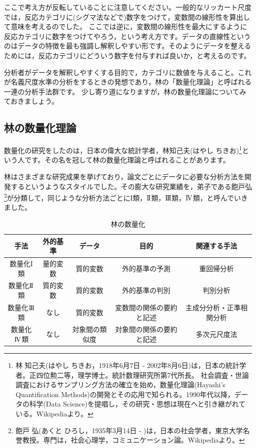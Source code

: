 \documentclass{ltjsbook}
\begin{document}
ここで考え方が反転していることに注意してください。一般的なリッカート尺度では，反応カテゴリに(シグマ法などで)数字をつけて，変数間の線形性を算出して意味を考えるのでした。
ここでは逆に，変数間の線形性を最大にするように反応カテゴリに数字をつけてやろう，という考え方です。データの直線性というのはデータの特徴を最も強調し解釈しやすい形です。そのようにデータを整えるためには，反応カテゴリにどういう数字を付与すれば良いか，と考えるのです。

分析者がデータを解釈しやすくする目的で，カテゴリに数値を与えること。これが名義尺度水準の分析をするときの発想であり，林の「数量化理論」と呼ばれる一連の分析手法群です。
少し寄り道になりますが，林の数量化理論についてみておきましょう。

\subsection{林の数量化理論}
数量化の研究をしたのは，日本の偉大な統計学者，林知己夫(はやし ちきお)\footnote{林 知己夫(はやし ちきお，1918年6月7日 - 2002年8月6日)は，日本の統計学者。正四位勲二等，理学博士。統計数理研究所第7代所長。 社会調査・世論調査におけるサンプリング方法の確立を始め，数量化理論(Hayashi's Quantification Methods)の開発とその応用で知られる。1990年代以降，データの科学(Data Science)を提唱し，その研究・思想は現在へと引き継がれている。Wikipediaより。}という人です。その名を冠して林の数量化理論と呼ばれることがあります。

林はさまざまな研究成果を挙げており，論文ごとにデータに必要な分析方法を開発するというようなスタイルでした。その膨大な研究業績を，弟子である飽戸弘\footnote{飽戸 弘(あくと ひろし，1935年3月14日 - )は，日本の社会学者，東京大学名誉教授。専門は，社会心理学，コミュニケーション論。Wikipediaより。}が分類して，同じような分析方法ごとにI類，$\mathrm{I}\hspace{-1.2pt}\mathrm{I}$類，$\mathrm{I}\hspace{-1.2pt}\mathrm{I}\hspace{-1.2pt}\mathrm{I}$類，$\mathrm{I}\hspace{-1.2pt}\mathrm{V}$類，と呼んでいきました。

\begin{table}[h]
    \caption{林の数量化}
    \begin{tabular}{c|c|c|c|c}
        手法    & 外的基準 & データ     & 目的           & 関連する手法       \\
        \hline
        数量化I類 & 量的変数 & 質的変数    & 外的基準の予測      & 重回帰分析        \\
        数量化$\mathrm{I}\hspace{-1.2pt}\mathrm{I}$ 類 & 質的変数 & 質的変数    & 外的基準の判別      & 判別分析         \\
        数量化$\mathrm{I}\hspace{-1.2pt}\mathrm{I}\hspace{-1.2pt}\mathrm{I}$類 & なし   & 質的変数    & 変数間の関係の要約と記述 & 主成分分析・正準相関分析 \\
        数量化$\mathrm{I}\hspace{-1.2pt}\mathrm{V}$類 & なし   & 対象間の類似度 & 対象間の関係の要約と記述 & 多次元尺度法       \\
    \end{tabular}
    \label{tbl::14_03}
\end{table}
\end{document}
